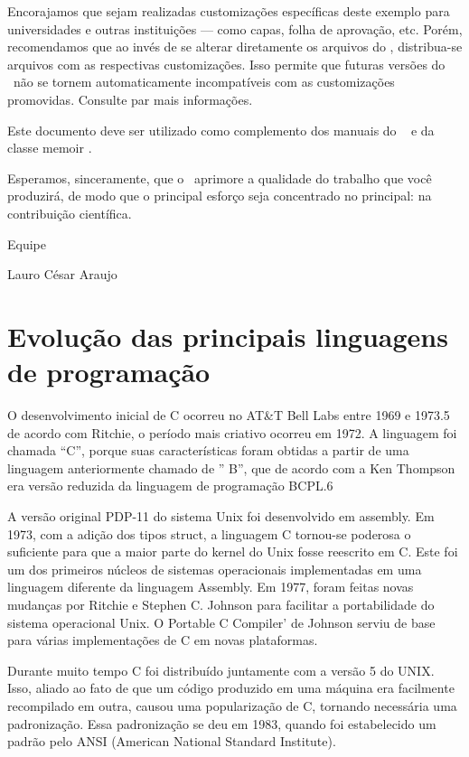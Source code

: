 \documentclass[
    12pt,               %
    openright,          %
    twoside,            %
    a4paper,            %
    brazil              %
    ]{abntex2}
\begin{document}
Encorajamos que sejam realizadas customizações específicas deste exemplo para
universidades e outras instituições --- como capas, folha de aprovação, etc.
Porém, recomendamos que ao invés de se alterar diretamente os arquivos do
\abnTeX, distribua-se arquivos com as respectivas customizações.
Isso permite que futuras versões do \abnTeX~não se tornem automaticamente
incompatíveis com as customizações promovidas. Consulte
 par mais informações.

Este documento deve ser utilizado como complemento dos manuais do \abnTeX\ 
\cite{abntex2classe,abntex2cite,abntex2cite-alf} e da classe \textsf{memoir}
\cite{memoir}. 

Esperamos, sinceramente, que o \abnTeX\ aprimore a qualidade do trabalho que
você produzirá, de modo que o principal esforço seja concentrado no principal:
na contribuição científica.

Equipe \abnTeX 

Lauro César Araujo


\part{Evolução das principais linguagens de programação}

O desenvolvimento inicial de C ocorreu no AT&T Bell Labs entre 1969 e 1973.5 de 
acordo com Ritchie, o período mais criativo ocorreu em 1972. A linguagem foi chamada 
“C”, porque suas características foram obtidas a partir de uma linguagem anteriormente 
chamado de ” B”, que de acordo com a Ken Thompson era versão reduzida da linguagem de 
programação BCPL.6

A versão original PDP-11 do sistema Unix foi desenvolvido em assembly. Em 1973, com a 
adição dos tipos struct, a linguagem C tornou-se poderosa o suficiente para que a 
maior parte do kernel do Unix fosse reescrito em C. Este foi um dos primeiros núcleos 
de sistemas operacionais implementadas em uma linguagem diferente da linguagem Assembly. 
Em 1977, foram feitas novas mudanças por Ritchie e Stephen C. Johnson para facilitar a 
portabilidade do sistema operacional Unix. O Portable C Compiler’ de Johnson serviu de 
base para várias implementações de C em novas plataformas.

Durante muito tempo C foi distribuído juntamente com a versão 5 do UNIX. Isso, aliado ao 
fato de que um código produzido em uma máquina era facilmente recompilado em outra, causou 
uma popularização de C, tornando necessária uma padronização. Essa padronização se deu em 
1983, quando foi estabelecido um padrão pelo ANSI (American National Standard Institute).
\end{document}
